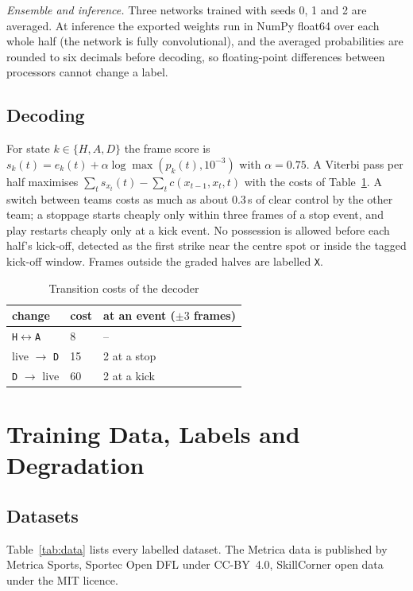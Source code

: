 \documentclass[conference]{IEEEtran}
\begin{document}
\emph{Ensemble and inference.} Three networks trained with seeds 0, 1 and 2 are averaged. At inference the exported
weights run in NumPy float64 over each whole half (the network is fully convolutional), and the averaged
probabilities are rounded to six decimals before decoding, so floating-point differences between processors cannot
change a label.

\subsection{Decoding}

For state $k\in\{H,A,D\}$ the frame score is $s_k(t)=e_k(t)+\alpha\log\max(p_k(t),10^{-3})$ with $\alpha=0.75$. A
Viterbi pass per half maximises $\sum_t s_{x_t}(t)-\sum_t c(x_{t-1},x_t,t)$ with the costs of
Table~\ref{tab:costs}. A switch between teams costs as much as about 0.3\,s of clear control by the other team; a
stoppage starts cheaply only within three frames of a stop event, and play restarts cheaply only at a kick event. No possession is allowed before each half's
kick-off, detected as the first strike near the centre spot or inside the tagged kick-off window. Frames outside the
graded halves are labelled \texttt{X}.

\begin{table}[t]
\caption{Transition costs of the decoder}
\label{tab:costs}
\centering
\begin{tabular}{@{}lll@{}}
\toprule
change & cost & at an event ($\pm3$ frames)\\
\midrule
\texttt{H}$\leftrightarrow$\texttt{A} & 8 & --\\
live $\to$ \texttt{D} & 15 & 2 at a stop\\
\texttt{D} $\to$ live & 60 & 2 at a kick\\
\bottomrule
\end{tabular}
\end{table}

\section{Training Data, Labels and Degradation}

\subsection{Datasets}

Table~\ref{tab:data} lists every labelled dataset.
The Metrica data is published by Metrica Sports, Sportec Open DFL under CC-BY~4.0, SkillCorner open data under the
MIT licence.
\end{document}
